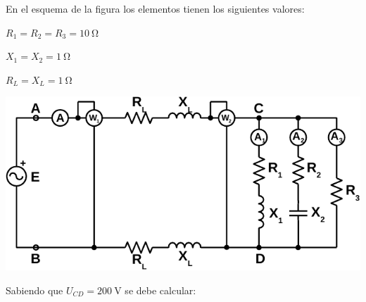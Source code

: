 \documentclass[12pt]{article}
\begin{document}

En el esquema de la figura los elementos tienen los siguientes valores:

$R_1 = R_2 = R_3 = \SI{10}{\ohm}$

$X_1 = X_2 = \SI{1}{\ohm}$%

$R_L = X_L = \SI{1}{\ohm}$

\begin{center}
  \includegraphics{../figs/circuitoA.pdf}
\end{center}

Sabiendo que $U_{CD} = \SI{200}{\volt}$ se debe calcular:
\end{document}
